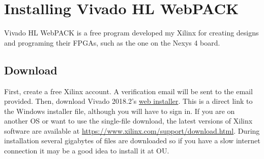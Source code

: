 \section{Installing Vivado HL WebPACK}
Vivado HL WebPACK is a free program developed my Xilinx for creating designs and programing their
FPGAs, such as the one on the Nexys 4 board.

\subsection{Download}
First, create a free Xilinx account.
A verification email will be sent to the email provided.
Then, download Vivado 2018.2's
\href{https://www.xilinx.com/member/forms/download/xef.html?filename=Xilinx_Vivado_SDK_Web_2018.2_0614_1954_Win64.exe}
{web installer}.
This is a direct link to the Windows installer file, although you will have to sign in.
If you are on another OS or want to use the single-file download, the latest versions of Xilinx
software are available at \url{https://www.xilinx.com/support/download.html}.
During installation several gigabytes of files are downloaded so if you have a slow internet
connection it may be a good idea to install it at OU.

